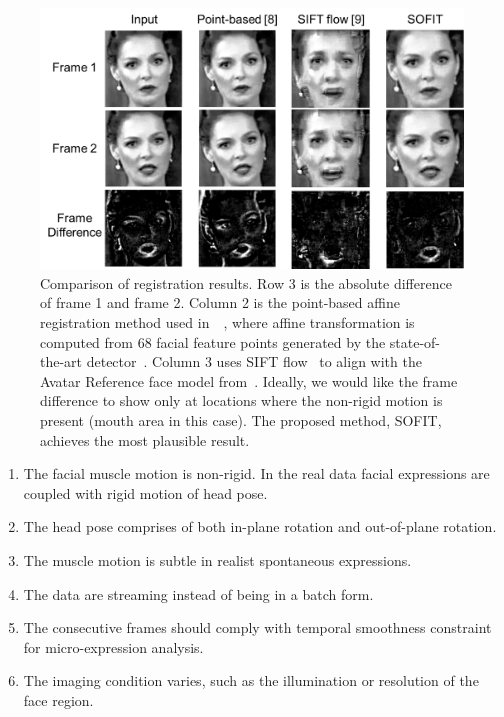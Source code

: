 \documentclass[10pt,journal]{IEEEtran}
\begin{document}
\begin{figure}[!t]
	\centering
		\includegraphics[width=\columnwidth]{fig/regComp.png}
	\caption{Comparison of registration results. Row 3 is the absolute difference of frame 1 and frame 2. Column 2 is the point-based affine registration method used in~\cite{Littlewort_CERT_FG2011}~\cite{Valstar_SMCB12}, where affine transformation is computed from 68 facial feature points generated by the state-of-the-art detector~\cite{Zhu_CVPR12}. Column 3 uses SIFT flow~\cite{Liu_PAMI11} to align with the Avatar Reference face model from~\cite{Yang_SMCB12}. Ideally, we would like the frame difference to show only at locations where the non-rigid motion is present (mouth area in this case). The proposed method, SOFIT, achieves the most plausible result.}
	\label{fig:regComp}
\end{figure}

\begin{enumerate}
\item The facial muscle motion is non-rigid. In the real data facial expressions are coupled with rigid motion of head pose.
\item The head pose comprises of both in-plane rotation and out-of-plane rotation.
\item The muscle motion is subtle in realist spontaneous expressions.
\item The data are streaming instead of being in a batch form.
\item The consecutive frames should comply with temporal smoothness constraint for micro-expression analysis.
\item The imaging condition varies, such as the illumination or resolution of the face region.
\end{enumerate}
\end{document}

